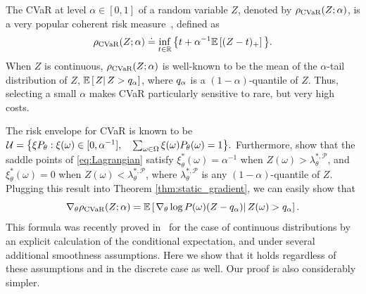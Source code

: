 \documentclass{article} %
\newcommand{\citet}{\cite}
\newcommand{\citep}{\cite}
\begin{document}
The CVaR at level $\alpha\in[0,1]$ of a random variable $Z$, denoted by $\rho_{\text{CVaR}}(Z;\alpha)$, is a very popular coherent risk measure~\citep{rockafellar2000optimization}, defined as
%
\begin{equation*}
\rho_{\text{CVaR}}(Z;\alpha) \doteq \inf_{t\in{\mathbb{R}}} \big\{ t + \alpha^{-1} \mathbb{E}\left[ (Z-t)_{+} \right]\big\}.
\end{equation*}
%
When $Z$ is continuous, $\rho_{\text{CVaR}}(Z;\alpha)$ is well-known to be the mean of the $\alpha$-tail distribution of $Z$, $\mathbb{E}\left[  \left. Z \right| Z > q_\alpha  \right]$, where $q_\alpha$ is a $(1-\alpha)$-quantile of $Z$. Thus, selecting a small $\alpha$ makes CVaR particularly sensitive to rare, but very high costs.

The risk envelope for CVaR is known to be~\citep{Shapiro2009}
$
{\mathcal{U}} = \big\{ \xi P_{\theta}: \xi(\omega) \in [0,\alpha^{-1}],\quad \sum_{\omega\in\Omega} \xi(\omega)P_\theta(\omega)=1\big\}.
$
Furthermore, \citet{Shapiro2009} show that the saddle points of \eqref{eq:Lagrangian} satisfy $\xi^*_{\theta}(\omega)=\alpha^{-1}$ when $Z(\omega)>\lambda^{*,\mathcal P}_{\theta}$, and $\xi^*_{\theta}(\omega)=0$ when $Z(\omega)<\lambda^{*,\mathcal P}_{\theta}$, where $\lambda^{*,\mathcal P}_{\theta}$ is any $(1-\alpha)$-quantile of $Z$. Plugging this result into Theorem \ref{thm:static_gradient}, we can easily show that
%
\begin{equation*}
    \nabla_{\theta}\rho_{\text{CVaR}}(Z;\alpha) = \mathbb{E}\left[ \left. \nabla_{\theta} \log P(\omega) (Z - q_\alpha)\right| Z(\omega) > q_\alpha \right].
\end{equation*}
%
This formula was recently proved in~\citet{tamar2015optimizing} for the case of continuous distributions by an explicit calculation of the conditional expectation, and under several additional smoothness assumptions. Here we show that it holds regardless of these assumptions and in the discrete case as well. Our proof is also considerably simpler.


\vspace{-0.1in}
\end{document}
